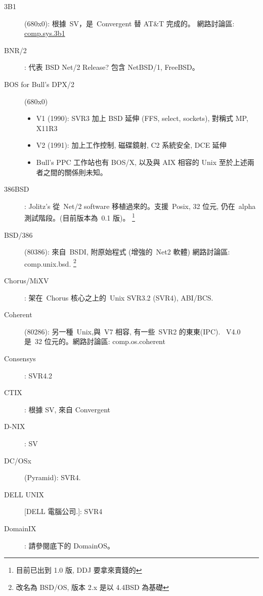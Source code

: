 \documentclass{article}
\begin{document}
\begin{CJK*}{Bg5}{ming}
{\begin{description}
      
      \item [3B1] (680x0): 根據~SV，是~Convergent 替 AT\&T 完成的。
         網路討論區: \url{comp.sys.3b1}

      \item [BNR/2]: 代表 BSD Net/2 Release? 包含 NetBSD/1, FreeBSD。

      \item [BOS for Bull's DPX/2] (680x0)
	\begin{itemize}
         \item V1 (1990): SVR3 加上 BSD 延伸 (FFS, select, sockets),
           對稱式 MP, X11R3
         \item  V2 (1991): 加上工作控制, 磁碟鏡射, C2 系統安全,
           DCE 延伸
         \item  Bull's PPC 工作站也有 BOS/X, 以及與 AIX 相容的 Unix
           至於上述兩者之間的關係則未知。
	\end{itemize}

      \item [386BSD]: Jolitz's 從~Net/2 software 移植過來的。支援~Posix, 32 位元,
           仍在~alpha 測試階段。(目前版本為~0.1 版)。
           \footnote{目前已出到 1.0 版, DDJ 要拿來賣錢的}

      \item [BSD/386] (80386): 來自~BSDI, 附原始程式 (增強的~Net2 軟體)
         網路討論區: comp.unix.bsd.
        \footnote{改名為 BSD/OS, 版本 2.x 是以 4.4BSD 為基礎}

      \item [Chorus/MiXV]: 架在~Chorus 核心之上的~Unix SVR3.2 (SVR4), 
	ABI/BCS.

      \item [Coherent] (80286): 
	另一種~Unix,與~V7 相容, 有一些~SVR2 的東東(IPC).
        ~V4.0 是~32 位元的。網路討論區: comp.os.coherent

      \item [Consensys]: SVR4.2

      \item [CTIX]: 根據 SV, 來自 Convergent

      \item [D-NIX]:  SV

      \item [DC/OSx] (Pyramid):  SVR4.

      \item [DELL UNIX] [DELL 電腦公司.]: SVR4

      \item [DomainIX]: 請參閱底下的 DomainOS。


\end{description}}
\end{CJK*}
\end{document}
